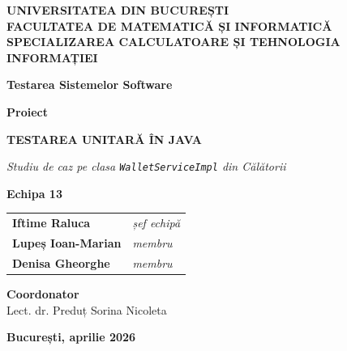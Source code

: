\begin{titlepage}


\begin{center}
\large
\textbf{UNIVERSITATEA DIN BUCUREȘTI}\\[0.2cm]
\textbf{FACULTATEA DE MATEMATICĂ ȘI INFORMATICĂ}\\[0.2cm]
\textbf{SPECIALIZAREA CALCULATOARE ȘI TEHNOLOGIA INFORMAȚIEI}
\end{center}

\vspace{2cm}

\begin{center}
\large \textbf{Testarea Sistemelor Software}
\end{center}

\vspace{1.5cm}

\begin{center}
\Large \textbf{Proiect}
\end{center}

\vspace{1cm}

\begin{center}
\huge \textbf{\MakeUppercase{Testarea unitară în Java}}
\end{center}

\vspace{0.6cm}

\begin{center}
\large \textit{Studiu de caz pe clasa \texttt{WalletServiceImpl} din \textit{Călătorii}}
\end{center}

\vspace{2.5cm}

\begin{center}
\large \textbf{Echipa 13}
\end{center}

\vspace{0.4cm}

\begin{center}
\begin{tabular}{ll}
\textbf{Iftime Raluca} & \textit{șef echipă} \\
\textbf{Lupeș Ioan-Marian} & \textit{membru} \\
\textbf{Denisa Gheorghe} & \textit{membru} \\
\end{tabular}
\end{center}

\vspace{2cm}

\begin{center}
\large \textbf{Coordonator}\\
Lect. dr. Preduț Sorina Nicoleta
\end{center}

\vfill

\begin{center}
\Large \textbf{București, aprilie 2026}
\end{center}

\end{titlepage}

